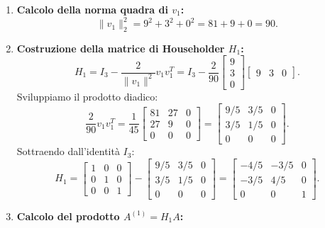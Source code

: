 \begin{example}
\begin{enumerate}
\begin{equation}
    \end{equation}
    \item \textbf{Calcolo della norma quadra di $v_1$:}
    \begin{equation}
        \|v_1\|_2^2 = 9^2 + 3^2 + 0^2 = 81 + 9 + 0 = 90.
    \end{equation}
    \item \textbf{Costruzione della matrice di Householder $H_1$:}
    \begin{equation}
        H_1 = I_3 - \frac{2}{\|v_1\|^2} v_1 v_1^T = I_3 - \frac{2}{90} \begin{bmatrix} 9 \\ 3 \\ 0 \end{bmatrix} \begin{bmatrix} 9 & 3 & 0 \end{bmatrix}.
    \end{equation}
    Sviluppiamo il prodotto diadico:
    \begin{equation}
        \frac{2}{90} v_1 v_1^T = \frac{1}{45} \begin{bmatrix} 81 & 27 & 0 \\ 27 & 9 & 0 \\ 0 & 0 & 0 \end{bmatrix} = \begin{bmatrix} 9/5 & 3/5 & 0 \\ 3/5 & 1/5 & 0 \\ 0 & 0 & 0 \end{bmatrix}.
    \end{equation}
    Sottraendo dall'identit\`a $I_3$:
    \begin{equation}
        H_1 = \begin{bmatrix} 1 & 0 & 0 \\ 0 & 1 & 0 \\ 0 & 0 & 1 \end{bmatrix} - \begin{bmatrix} 9/5 & 3/5 & 0 \\ 3/5 & 1/5 & 0 \\ 0 & 0 & 0 \end{bmatrix} = \begin{bmatrix} -4/5 & -3/5 & 0 \\ -3/5 & 4/5 & 0 \\ 0 & 0 & 1 \end{bmatrix}.
    \end{equation}
    \item \textbf{Calcolo del prodotto $A^{(1)} = H_1 A$:}
    \begin{itemize}

\end{itemize}
\end{enumerate}
\end{example}
